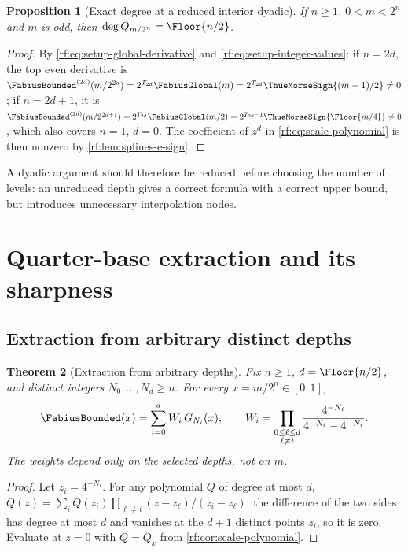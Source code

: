 \documentclass[11pt,oneside]{article}
\theoremstyle{plain}
\newtheorem{theorem}{Theorem}[section]
\newtheorem{proposition}[theorem]{Proposition}
\theoremstyle{definition}
\theoremstyle{remark}
\newcommand{\Fb}{\FabiusBounded}            %
\newcommand{\Fg}{\FabiusGlobal}             %
\newcommand{\tm}[1]{\ThueMorseSign{#1}}     %
\newcommand{\Tr}[1]{T_{#1}}                 %
\begin{document}
\begin{proposition}[Exact degree at a reduced interior dyadic]
\label{rf:prop:exact-degree}
If $n\ge1$, $0<m<2^{n}$ and $m$ is odd, then $\deg Q_{m/2^{n}}=\Floor{n/2}$.
\end{proposition}

\begin{proof}
By \cref{rf:eq:setup-global-derivative} and
\cref{rf:eq:setup-integer-values}: if $n=2d$, the top even derivative is
$\Fb^{(2d)}(m/2^{2d})=2^{\Tr{2d}}\Fg(m)=2^{\Tr{2d}}\tm{(m-1)/2}\neq0$; if
$n=2d+1$, it is $\Fb^{(2d)}(m/2^{2d+1})=2^{\Tr{2d}}\Fg(m/2)
=2^{\Tr{2d}-1}\tm{\Floor{m/4}}\neq0$, which also covers $n=1$, $d=0$.  The
coefficient of $z^{d}$ in \cref{rf:eq:scale-polynomial} is then nonzero by
\cref{rf:lem:splines-e-sign}.
\end{proof}

A dyadic argument should therefore be reduced before choosing the number of
levels: an unreduced depth gives a correct formula with a correct upper
bound, but introduces unnecessary interpolation nodes.

\section{Quarter-base extraction and its sharpness}
\label{rf:sec:extraction}

\subsection{Extraction from arbitrary distinct depths}
\label{rf:sec:extraction-arbitrary}

\begin{theorem}[Extraction from arbitrary depths]
\label{rf:thm:extraction-arbitrary}
Fix $n\ge1$, $d=\Floor{n/2}$, and distinct integers $N_{0},\ldots,N_{d}\ge n$.
For every $x=m/2^{n}\in[0,1]$,
\begin{equation}
 \Fb(x)=\sum_{i=0}^{d}W_{i}\,G_{N_{i}}(x),\qquad
 W_{i}=\prod_{\substack{0\le\ell\le d\\ \ell\neq i}}
 \frac{4^{-N_{\ell}}}{4^{-N_{\ell}}-4^{-N_{i}}}.
 \label{rf:eq:extraction-arbitrary}
\end{equation}
The weights depend only on the selected depths, not on $m$.
\end{theorem}

\begin{proof}
Let $z_{i}=4^{-N_{i}}$.  For any polynomial $Q$ of degree at most $d$,
$Q(z)=\sum_{i}Q(z_{i})\prod_{\ell\neq i}(z-z_{\ell})/(z_{i}-z_{\ell})$: the
difference of the two sides has degree at most $d$ and vanishes at the $d+1$
distinct points $z_{i}$, so it is zero.  Evaluate at $z=0$ with $Q=Q_{x}$
from \cref{rf:cor:scale-polynomial}.
\end{proof}
\end{document}
